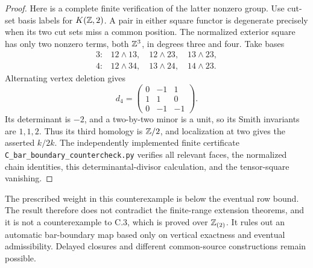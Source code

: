 \begin{proof}
Here is a complete finite verification of the latter nonzero group.
Use cut-set basis labels for $K(\mathbb Z,2)$. A pair in either square
functor is degenerate precisely when its two cut sets miss a common
position. The normalized exterior square has only two nonzero
terms, both $\mathbb Z^3$, in degrees three and four. Take bases
\[
 \begin{array}{ll}
 3:&12\wedge13,\quad12\wedge23,\quad13\wedge23,\\
 4:&12\wedge34,\quad13\wedge24,\quad14\wedge23.
 \end{array}
\]
Alternating vertex deletion gives
\[
 d_4=\begin{pmatrix}
 0&-1&1\\
 1&1&0\\
 0&-1&-1
 \end{pmatrix}.
\]
Its determinant is $-2$, and a two-by-two minor is a unit, so its
Smith invariants are $1,1,2$. Thus its third homology is $\mathbb Z/2$,
and localization at two gives the asserted $k/2k$.
The independently implemented finite certificate
\texttt{C\_bar\_boundary\_countercheck.py} verifies all relevant
faces, the normalized chain identities, this determinantal-divisor
calculation, and the tensor-square vanishing.
\end{proof}

The prescribed weight in this counterexample is below the eventual
row bound. The result therefore does not contradict the finite-range
extension theorems, and it is not a counterexample to C.3, which is
proved over $\mathbb Z_{(2)}$. It rules out an automatic bar-boundary map
based only on vertical exactness and eventual admissibility. Delayed
closures and different common-source constructions remain possible.
